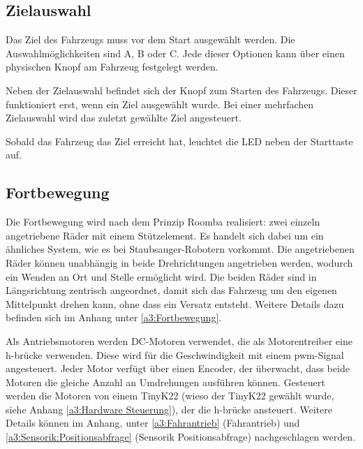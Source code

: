 \documentclass[../main.tex]{subfiles}
\begin{document}
\newpage
\subsection{Zielauswahl}

Das Ziel des Fahrzeugs muss vor dem Start ausgewählt werden. Die Auswahlmöglichkeiten sind A, B oder C. Jede dieser Optionen kann über einen physischen Knopf am Fahrzeug festgelegt werden.

Neben der Zielauswahl befindet sich der Knopf zum Starten des Fahrzeugs. Dieser funktioniert erst, wenn ein Ziel ausgewählt wurde. Bei einer mehrfachen Zielauswahl wird das zuletzt gewählte Ziel angesteuert.

Sobald das Fahrzeug das Ziel erreicht hat, leuchtet die LED neben der Starttaste auf.

\subsection{Fortbewegung} 

Die Fortbewegung wird nach dem Prinzip Roomba realisiert: zwei einzeln angetriebene Räder mit einem Stützelement. Es handelt sich dabei um ein ähnliches System, wie es bei Staubsauger-Robotern vorkommt. Die angetriebenen Räder können unabhängig in beide Drehrichtungen angetrieben werden, wodurch ein Wenden an Ort und Stelle ermöglicht wird. Die beiden Räder sind in Längsrichtung zentrisch angeordnet, damit sich das Fahrzeug um den eigenen Mittelpunkt drehen kann, ohne dass ein Versatz entsteht. Weitere Details dazu befinden sich im Anhang unter \ref{a3:Fortbewegung}.

Als Antriebsmotoren werden DC-Motoren verwendet, die als Motorentreiber eine \gls{h-brücke} verwenden. Diese wird für die Geschwindigkeit mit einem \gls{pwm}-Signal angesteuert. Jeder Motor verfügt über einen Encoder, der überwacht, dass beide Motoren die gleiche Anzahl an Umdrehungen ausführen können. Gesteuert werden die Motoren von einem TinyK22 (wieso der TinyK22 gewählt wurde, siehe Anhang \ref{a3:Hardware Steuerung}), der die \gls{h-brücke} ansteuert. Weitere Details können im Anhang, unter \ref{a3:Fahrantrieb} (Fahrantrieb) und \ref{a3:Sensorik:Positionsabfrage} (Sensorik Positionsabfrage) nachgeschlagen werden.
\end{document}
